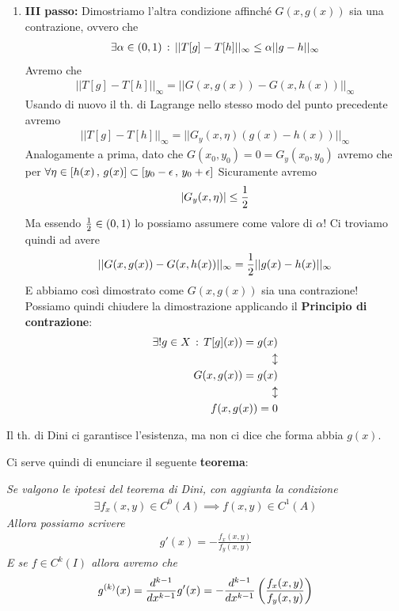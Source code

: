 \begin{enumerate}
	\item \textbf{III passo:} Dimostriamo l'altra condizione affinché $G(x,g(x))$ sia una contrazione, ovvero che
	\begin{align}
		\exists \alpha \in (0,1) \, : \, ||T[g] - T[h]||_\infty \leq \alpha || g -h  ||_\infty 
	\end{align}
	Avremo che
	\begin{align}
		||T[g] - T[h]||_\infty = ||G(x,g(x)) - G(x,h(x))||_\infty
	\end{align}
	Usando di nuovo il th. di Lagrange nello stesso modo del punto precedente avremo
	\begin{align}
		||T[g] - T[h]||_\infty = ||G_y(x,\eta) (g(x) -h(x))||_\infty
	\end{align}
	Analogamente a prima, dato che  $G(x_0,y_0)=0= G_y(x_0,y_0)$ avremo che per $\forall \eta \in [h(x)\, , \, g(x)]\subset[y_0 - \epsilon \, , \, y_0 + \epsilon]$
	Sicuramente avremo
	\begin{align}
		|G_y(x,\eta)|\leq \frac{1}{2}
	\end{align}
	Ma essendo $\frac{1}{2} \in (0,1)$ lo possiamo assumere come valore di $\alpha$! Ci troviamo quindi ad avere
	\begin{align}
		||G(x,g(x)) - G(x,h(x))||_\infty = \frac{1}{2}||g(x) - h(x)||_\infty
	\end{align}
	E abbiamo così dimostrato come $G(x,g(x))$ sia una contrazione! Possiamo quindi chiudere la dimostrazione applicando il \textbf{Principio di contrazione}:
	\begin{align}
		\exists ! g \in X \, : \, T[g](x)) = g(x)\\
		\updownarrow \nonumber \\ 
		G(x,g(x))=g(x) \\
		\updownarrow \nonumber \\
		f(x,g(x))=0
	\end{align}
\end{enumerate}


Il th. di Dini ci garantisce l'esistenza, ma non  ci dice che forma abbia $g(x)$. 

Ci serve quindi di enunciare il seguente \textbf{teorema}:

\bigskip

\textit{Se valgono le ipotesi del teorema di Dini, con aggiunta la condizione}
\begin{align}
	\exists f_x(x,y)\in C^0(A)\implies f(x,y)\in C^1(A)
\end{align}
\textit{Allora possiamo scrivere}
\begin{align}
	g'(x)= - \frac{f_x(x,y)}{f_y(x,y)}
\end{align}
\textit{E se $f\in C^k(I)$ allora avremo che}
\begin{align}
	g^{(k)}(x) = \frac{d^{k-1} }{d x^{k-1}} g'(x)= - \frac{d^{k-1} }{d x^{k-1}} \left( \frac{f_x(x,y)}{f_y(x,y)} \right)
\end{align}

